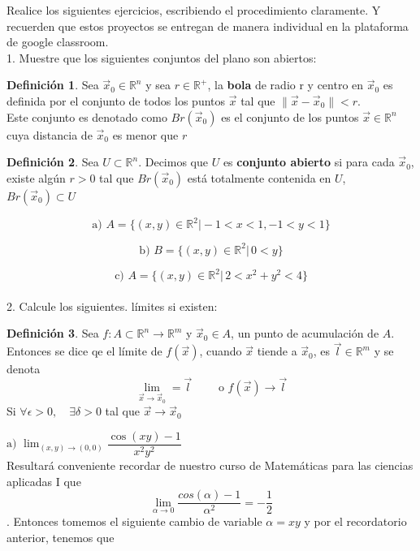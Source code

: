 \documentclass[letterpaper]{article}
\providecommand{\norm}[1]{\lVert#1\rVert}
\newcommand{\R}{\mathds{R}}
\renewcommand{\*}{\cdot}
\theoremstyle{definition}
\newtheorem{definition}{Definición}
\begin{document}
\noindent Realice los siguientes ejercicios, escribiendo el procedimiento claramente. Y recuerden que estos proyectos se entregan de manera individual en la plataforma de google classroom. \\[0.5cm]
1.  Muestre que los siguientes conjuntos del plano son abiertos: 
\begin{definition}
	Sea $ \vec{x}_0  \in \R^n$  y sea $ r \in \R^+ $, la \textbf{bola} de radio r y centro en $ \vec{x}_0 $ es definida por el conjunto de todos los puntos $ \vec{x} $ tal que $ \norm{\vec{x} - \vec{x}_0} < r $.\\ Este conjunto es denotado como $ Br(\vec{x}_0) $ es el conjunto de los puntos $ \vec{x} \in \R^n $ cuya distancia de $ \vec{x}_0 $ es menor que $ r $
\end{definition}

\begin{definition}
	Sea $ U \subset \R^n $. Decimos que $ U $ es \textbf{conjunto abierto} si para cada $ \vec{x}_0 $, existe algún $ r>0 $ tal que $ Br(\vec{x}_0) $ está totalmente contenida en $ U $, $ Br(\vec{x}_0) \subset U $

\end{definition}

$$\text{a) } A = \{ (x,y) \in \mathbb{R}^2 \vert - 1 < x < 1, - 1 < y < 1 \}$$

$$\text{b) }B = \{ (x,y) \in \mathbb{R}^2 \vert \,  0 < y  \}$$

$$\text{c) }A = \{ (x,y) \in \mathbb{R}^2 \vert \, 2 < x^2  + y^2 <  4 \}$$\\[0.5cm]
2.  Calcule los siguientes. límites si existen: 
\begin{definition}
	Sea $ f: A \subset \R^n \to \R^m $ y $ \vec{x}_0 \in A $, un punto de acumulación de $ A $. Entonces se dice qe el límite de $  f(\vec{x}) $, cuando $ \vec{x} $ tiende a $ \vec{x}_0 $, es $ \vec{\textit{l}} \in \R^m $ y se denota
	\[ \lim\limits_{\vec{x} \to \vec{x}_0} = \vec{\textit{l}} \qquad \text{ o } f(\vec{x}) \to \vec{\textit{l}} \]
	Si $ \forall \epsilon > 0, \quad \exists  \delta > 0 $ tal que $ \vec{x} \to \vec{x}_0 $
\end{definition}


$\text{a) }\displaystyle\lim_{(x,y) \to (0,0)} \dfrac{\cos(xy) - 1}{x^2y^2}$\\
Resultará conveniente recordar de nuestro curso de Matemáticas para las ciencias aplicadas I que $$ \lim\limits_{\alpha \to 0} \dfrac{cos(\alpha) - 1}{\alpha^2} = -\dfrac{1}{2} $$.  
Entonces tomemos el siguiente cambio de variable $ \alpha = xy $
y por el recordatorio anterior, tenemos que 
 
\end{document}
